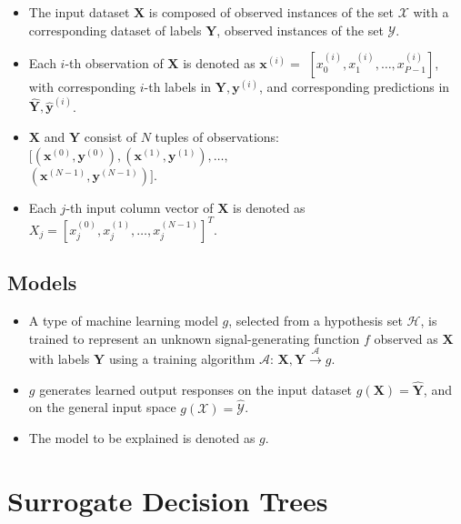 \documentclass[11pt]{asaproc}
\begin{document}
	\begin{itemize}
		\item The input dataset $\mathbf{X}$ is composed of observed instances of the set $\mathcal{X}$ with a corresponding dataset of labels $\mathbf{Y}$, observed instances of the set $\mathcal{Y}$.
		\item Each $i$-th observation of $\mathbf{X}$ is denoted as $\mathbf{x}^{(i)} = $  
		$[x_0^{(i)}, x_1^{(i)}, \dots, x_{\textit{P}-1}^{(i)}]$, with corresponding $i$-th labels in $\mathbf{Y}, \mathbf{y}^{(i)}$, and corresponding predictions in $\mathbf{\hat{Y}}, \mathbf{\hat{y}}^{(i)}$. %
		\item $\mathbf{X}$ and $\mathbf{Y}$ consist of $N$ tuples of observations: $[(\mathbf{x}^{(0)},\mathbf{y}^{(0)}), (\mathbf{x}^{(1)},\mathbf{y}^{(1)}), \dots,$\\$(\mathbf{x}^{(N-1)},\mathbf{y}^{(N-1)})]$. %
		\item Each $j$-th input column vector of $\mathbf{X}$ is denoted as $X_j = [x_{j}^{(0)}, x_{j}^{(1)}, \dots, x_{j}^{(N-1)}]^T$.
	\end{itemize}	 

\subsection{Models}

	\begin{itemize}
		\item A type of machine learning model $g$, selected from a hypothesis set $\mathcal{H}$, is trained to represent an unknown signal-generating function $f$ observed as  $\mathbf{X}$ with labels $\mathbf{Y}$ using a training algorithm $\mathcal{A}$: 
		$ \mathbf{X}, \mathbf{Y} \xrightarrow{\mathcal{A}} g$.
		\item $g$ generates learned output responses on the input dataset $g(\mathbf{X}) = \mathbf{\hat{Y}}$, and on the general input space $g(\mathcal{X}) = \mathcal{\hat{Y}}$.
		\item The model to be explained is denoted as $g$.
	\end{itemize}

\section{Surrogate Decision Trees} \label{sec:surrogate_dt}
\end{document}

